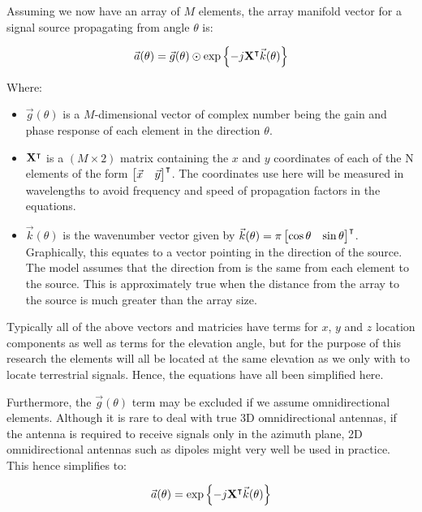 Assuming we now have an array of \(M\) elements, the array manifold vector for a signal source propagating from angle \(\theta\) is: \cite{dacos1995estimating}

\begin{equation}
\vec{a}(\theta) = \vec{g}(\theta) \odot \exp \left\{ -j \mathbf{X}^\intercal \vec{k}(\theta) \right\}
\end{equation}

Where:
\begin{itemize}
  \item \(\vec{g}(\theta)\) is a \(M\)-dimensional vector of complex number being the gain and phase response  of each element in the direction \(\theta\). 
\item \(\mathbf{X}^\intercal\) is a \((M \times 2)\) matrix containing the \(x\) and \(y\) coordinates of each of the N elements of the form \(\begin{bmatrix} \vec{x} & \vec{y} \end{bmatrix}^\intercal\). The coordinates use here will be measured in wavelengths to avoid frequency and speed of propagation factors in the equations.
\item \(\vec{k}(\theta)\) is the wavenumber vector given by \(\vec{k}(\theta) = \pi \begin{bmatrix} \cos\theta & \sin\theta \end{bmatrix}^\intercal \). Graphically, this equates to a vector pointing in the direction of the source. The model assumes that the direction from is the same from each element to the source. This is approximately true when the distance from the array to the source is much greater than the array size.
\end{itemize}

Typically all of the above vectors and matricies have terms for \(x\), \(y\) and \(z\) location components as well as terms for the elevation angle, but for the purpose of this research the elements will all be located at the same elevation as we only with to locate terrestrial signals. Hence, the equations have all been simplified here.

Furthermore, the \(\vec{g}(\theta)\) term may be excluded if we assume omnidirectional elements. Although it is rare to deal with true 3D omnidirectional antennas, if the antenna is required to receive signals only in the azimuth plane, 2D omnidirectional antennas such as dipoles might very well be used in practice. This hence simplifies to:

\begin{equation}
  \vec{a}(\theta) = \exp \left\{ -j \mathbf{X}^\intercal \vec{k}(\theta) \right\}
\end{equation}

